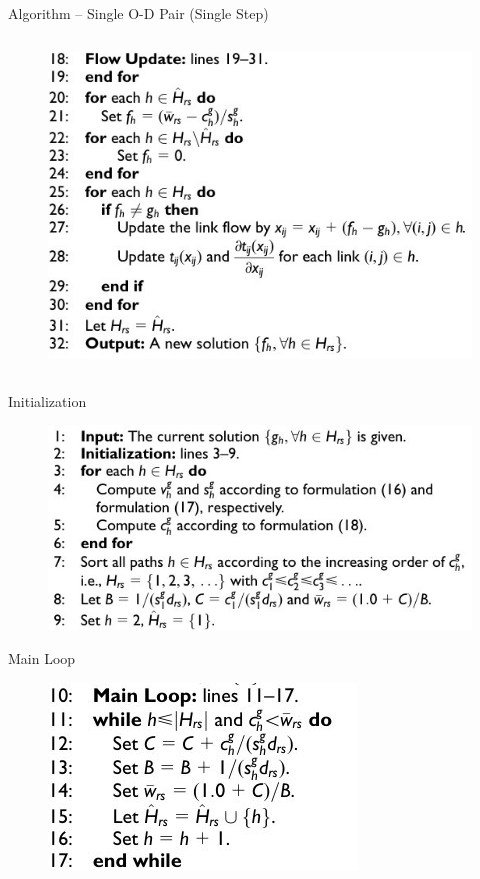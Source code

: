 \documentclass{beamer}
\begin{document}
\begin{frame}{Algorithm -- Single O-D Pair (Single Step)}
\begin{columns}
    \begin{column}{0.4\textwidth}
    \begin{figure}
    \includegraphics[width=\textwidth]{./alg13.jpg}
    \end{figure}
    \end{column}
\end{columns}
\end{frame}


\begin{frame}{Initialization}
    \begin{figure}
    \includegraphics[width=\textwidth]{./alg11.jpg}
    \end{figure}
\end{frame}


\begin{frame}{Main Loop}
    \begin{figure}
    \includegraphics[scale=0.5]{./alg12.jpg}
    \end{figure}
\end{frame}
\end{document}
